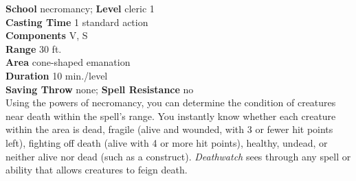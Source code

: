 \textbf{School} necromancy; \textbf{Level} cleric 1\\
\textbf{Casting Time} 1 standard action\\
\textbf{Components} V, S\\
\textbf{Range} 30 ft.\\
\textbf{Area} cone-shaped emanation\\
\textbf{Duration} 10 min./level\\
\textbf{Saving Throw} none; \textbf{Spell Resistance} no\\
Using the powers of necromancy, you can determine the condition of creatures near death within the spell's range. You instantly know whether each creature within the area is dead, fragile (alive and wounded, with 3 or fewer hit points left), fighting off death (alive with 4 or more hit points), healthy, undead, or neither alive nor dead (such as a construct). \textit{Deathwatch }sees through any spell or ability that allows creatures to feign death.\\
